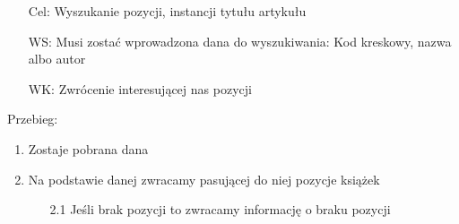 \documentclass{article}
\begin{document}
		\normalsize
	\begin{enumerate}
		\item[Cel:] Wyszukanie pozycji, instancji tytułu artykułu
		\item[WS:]Musi zostać wprowadzona dana do wyszukiwania: Kod kreskowy, nazwa albo autor
		\item[WK:] Zwrócenie interesującej nas pozycji
	\end{enumerate}
	Przebieg:
	\begin{enumerate}
		\item Zostaje pobrana dana
		\item Na podstawie danej zwracamy pasującej do niej pozycje książek
		\begin{enumerate}
			\item [2.1] Jeśli brak pozycji to zwracamy informację o braku pozycji
		\end{enumerate}
	\end{enumerate}
\end{document}
